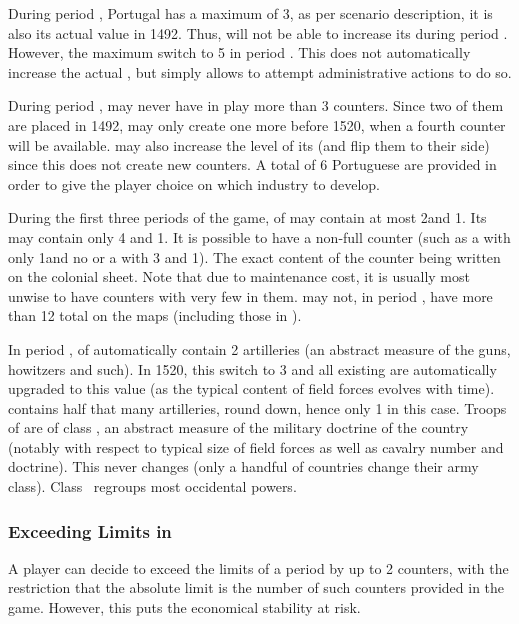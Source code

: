\begin{exemple}
  During period , Portugal has a maximum \DTI of 3, as per scenario
  description, it is also its actual value in 1492. Thus, \POR will not be
  able to increase its \DTI during period . However, the maximum
  \DTI switch to 5 in period . This does not automatically increase
  the actual \DTI, but simply allows \POR to attempt administrative actions to
  do so.

  During period , \POR may never have in play more than 3 \MNU
  counters. Since two of them are placed in 1492, \POR may only create one
  more before 1520, when a fourth counter will be available. \POR may also
  increase the level of its \MNU (and flip them to their \Faceplus side) since
  this does not create new counters. A total of 6 Portuguese \MNU are provided
  in order to give the player choice on which industry to develop.

  During the first three periods of the game, \FLEET\facemoins of \POR may
  contain at most 2\ND and 1\NTD. Its \FLEET\faceplus may contain only 4\ND
  and 1\NTD. It is possible to have a non-full counter (such as a
  \FLEET\facemoins with only 1\ND and no \NTD or a \FLEET\faceplus with 3\ND
  and 1\NTD). The exact content of the counter being written on the colonial
  sheet. Note that due to maintenance cost, it is usually most unwise to have
  \FLEET counters with very few \ND in them. \POR may not, in period
  , have more than 12 total \ND on the maps (including those in
  \FLEET).

  In period , \ARMY\faceplus of \POR automatically contain 2
  artilleries (an abstract measure of the guns, howitzers and such). In 1520,
  this switch to 3 and all existing \ARMY are automatically upgraded to this
  value (as the typical content of field forces evolves with
  time). \ARMY\facemoins contains half that many artilleries, round down,
  hence only 1 in this case. Troops of \POR are of class \CAIII, an abstract
  measure of the military doctrine of the country (notably with respect to
  typical size of field forces as well as cavalry number and doctrine). This
  never changes (only a handful of countries change their army class). Class
  \CAIII\ regroups most occidental powers.
\end{exemple}


\subsubsection{Exceeding Limits in \MNU}
\label{chThePowers:Exceeding Limits}
\aparag A player can decide to exceed the limits of a period by up to 2 \MNU
counters, with the restriction that the absolute limit is the number of such
counters provided in the game.  However, this puts the economical stability at
risk.

